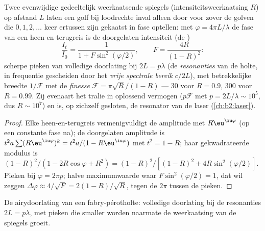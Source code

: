 \begin{proposition}\label{prop:b2:gratings:fabryperot}
Twee evenwijdige gedeeltelijk weerkaatsende spiegels (intensiteitsweerkaatsing $R$)
op afstand $L$ laten een golf bij loodrechte inval alleen door voor zover
de golven die $0, 1, 2, \dots$ keer ertussen zijn gekaatst in fase
optellen: met $\varphi = 4\pi L/\lambda$ de fase van een heen-en-terugreis
is de doorgelaten
intensiteit (de )
\[
\frac{I_t}{I_0} = \frac1{1 + F\sin^2(\varphi/2)} , \qquad F = \frac{4R}{(1 - R)^2} :
\]
scherpe pieken van volledige doorlating bij $2L = p\lambda$ (de \emph{resonanties}
van de holte, in frequentie gescheiden door het \emph{vrije spectrale bereik}
$c/2L$), met betrekkelijke breedte $1/\mathcal F$ met de \emph{finesse}
$\mathcal F = \pi
\sqrt R/(1 - R)$ --- $30$ voor $R = 0.9$, $300$ voor
$R = 0.99$. Zij evenaart het tralie
in oplossend vermogen ($p\mathcal F$ met $p = 2L/\lambda \sim 10^5$, dus
$R \sim
10^7$) en is, op zichzelf gesloten, de resonator van de laser
(\cref{ch:b2:laser}).
\end{proposition}

\begin{proof}
Elke heen-en-terugreis vermenigvuldigt de amplitude met $R\eu^{\iu\varphi}$ (op een
constante fase na); de doorgelaten amplitude is
$t^2a\sum(R\eu^{\iu\varphi})^k =
t^2a/(1 - R\eu^{\iu\varphi})$ met
$t^2 = 1 - R$; haar gekwadrateerde modulus is
$(1 - R)^2/
(1 - 2R\cos\varphi + R^2) = (1 - R)^2/[(1 - R)^2 + 4R\sin^2(\varphi/2)]$.
Pieken bij
$\varphi = 2\pi p$; halve maximumwaarde waar $F\sin^2(\varphi/2) = 1$, dat
wil zeggen $\Delta\varphi \approx
4/\sqrt F = 2(1 - R)/\sqrt R$, tegen de
$2\pi$ tussen de pieken.
\end{proof}

\begin{omfigure}

{\small De airydoorlating van een fabry-pérotholte: volledige
doorlating bij de resonanties $2L = p\lambda$, met pieken die smaller worden
naarmate de
weerkaatsing van de spiegels groeit.}
\end{omfigure}

